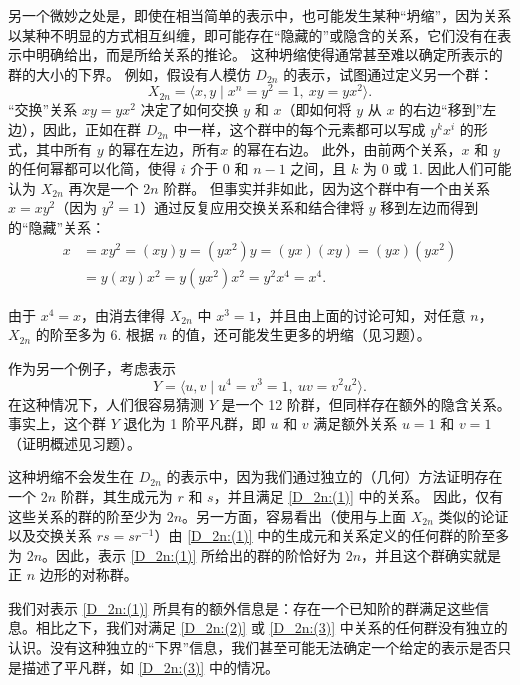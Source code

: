 另一个微妙之处是，即使在相当简单的表示中，也可能发生某种“坍缩”，因为关系以某种不明显的方式相互纠缠，即可能存在“隐藏的”或隐含的关系，它们没有在表示中明确给出，而是所给关系的推论。
这种坍缩使得通常甚至难以确定所表示的群的大小的下界。
例如，假设有人模仿 \( D_{2n} \) 的表示，试图通过定义另一个群：
\[
X_{2n} = \langle x, y \mid x^n = y^2 = 1,\ xy = yx^2 \rangle. \tag{1.2}
\]
“交换”关系 \( xy = yx^2 \) 决定了如何交换 \( y \) 和 \( x \)（即如何将 \( y \) 从 \( x \) 的右边“移到”左边），因此，正如在群 \( D_{2n} \) 中一样，这个群中的每个元素都可以写成 \( y^k x^i \) 的形式，其中所有 \( y \) 的幂在左边，所有\( x \) 的幂在右边。
此外，由前两个关系，\( x \) 和 \( y \) 的任何幂都可以化简，使得 \( i \) 介于 0 和 \( n-1 \) 之间，且 \( k \) 为 0 或 1.
因此人们可能认为 \( X_{2n} \) 再次是一个 \( 2n \) 阶群。
但事实并非如此，因为这个群中有一个由关系 \( x = xy^2 \)（因为 \( y^2 = 1 \)）通过反复应用交换关系和结合律将 \( y \) 移到左边而得到的“隐藏”关系：
\[
\begin{aligned}
x &= xy^2 = (xy)y = (yx^2)y = (yx)(xy) = (yx)(yx^2) \\
  &= y(xy)x^2 = y(yx^2)x^2 = y^2x^4 = x^4.
\end{aligned}
\]

由于 \( x^4 = x \)，由消去律得 \( X_{2n} \) 中 \( x^3 = 1 \)，并且由上面的讨论可知，对任意 \( n \)，\( X_{2n} \) 的阶至多为 6. 
根据 \( n \) 的值，还可能发生更多的坍缩（见习题）。

作为另一个例子，考虑表示
\[
Y = \langle u, v \mid u^4 = v^3 = 1,\ uv = v^2u^2 \rangle. \tag{1.3}
\]
在这种情况下，人们很容易猜测 \( Y \) 是一个 12 阶群，但同样存在额外的隐含关系。
事实上，这个群 \( Y \) 退化为 1 阶平凡群，即 \( u \) 和 \( v \) 满足额外关系 \( u = 1 \) 和 \( v = 1 \)（证明概述见习题）。

这种坍缩不会发生在 \( D_{2n} \) 的表示中，因为我们通过独立的（几何）方法证明存在一个 \( 2n \) 阶群，其生成元为 \( r \) 和 \( s \)，并且满足 \ref{D_2n:(1)} 中的关系。
因此，仅有这些关系的群的阶至少为 \( 2n \)。另一方面，容易看出（使用与上面 \( X_{2n} \) 类似的论证以及交换关系 \( rs = sr^{-1} \)）由 \ref{D_2n:(1)} 中的生成元和关系定义的任何群的阶至多为 \( 2n \)。因此，表示 \ref{D_2n:(1)} 所给出的群的阶恰好为 \( 2n \)，并且这个群确实就是正 \( n \) 边形的对称群。

我们对表示 \ref{D_2n:(1)} 所具有的额外信息是：存在一个已知阶的群满足这些信息。相比之下，我们对满足 \ref{D_2n:(2)} 或 \ref{D_2n:(3)} 中关系的任何群没有独立的认识。没有这种独立的“下界”信息，我们甚至可能无法确定一个给定的表示是否只是描述了平凡群，如 \ref{D_2n:(3)} 中的情况。

